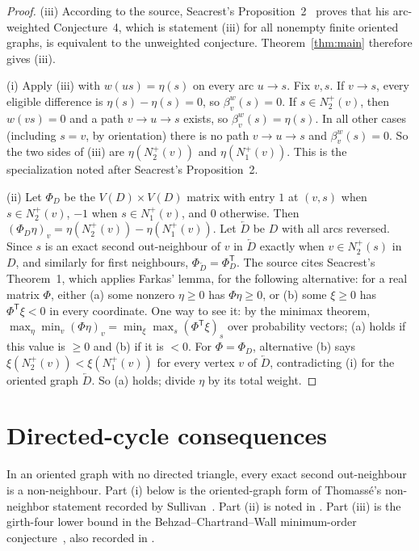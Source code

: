 \documentclass[11pt]{article}
\theoremstyle{remark}
\begin{document}
\begin{proof}
\textup{(iii)} According to the source, Seacrest's
Proposition~2~\cite{Seacrest2015} proves that his arc-weighted Conjecture~4,
which is statement \textup{(iii)} for all nonempty finite oriented graphs,
is equivalent to the unweighted conjecture.  Theorem~\ref{thm:main}
therefore gives \textup{(iii)}.

\textup{(i)} Apply \textup{(iii)} with $w(us)=\eta(s)$ on every arc
$u\to s$.  Fix $v,s$.  If $v\to s$, every eligible difference is
$\eta(s)-\eta(s)=0$, so $\beta_v^w(s)=0$.  If $s\in N_2^+(v)$, then
$w(vs)=0$ and a path $v\to u\to s$ exists, so $\beta_v^w(s)=\eta(s)$.  In
all other cases (including $s=v$, by orientation) there is no path
$v\to u\to s$ and $\beta_v^w(s)=0$.  So the two sides of \textup{(iii)} are
$\eta(N_2^+(v))$ and $\eta(N_1^+(v))$.  This is the specialization noted
after Seacrest's Proposition~2.

\textup{(ii)} Let $\Phi_D$ be the $V(D)\times V(D)$ matrix with entry $1$ at
$(v,s)$ when $s\in N_2^+(v)$, $-1$ when $s\in N_1^+(v)$, and $0$ otherwise.
Then $(\Phi_D\eta)_v=\eta(N_2^+(v))-\eta(N_1^+(v))$.  Let $\overleftarrow D$
be $D$ with all arcs reversed.  Since $s$ is an exact second out-neighbour
of $v$ in $\overleftarrow D$ exactly when $v\in N_2^+(s)$ in $D$, and
similarly for first neighbours,
$\Phi_{\overleftarrow D}=\Phi_D^{\mathsf T}$.  The source cites Seacrest's
Theorem~1, which applies Farkas' lemma, for the following alternative: for a
real matrix $\Phi$, either (a) some nonzero $\eta\ge0$ has $\Phi\eta\ge0$,
or (b) some $\xi\ge0$ has $\Phi^{\mathsf T}\xi<0$ in every coordinate.  One
way to see it: by the minimax theorem,
$\max_\eta\min_v(\Phi\eta)_v=\min_\xi\max_s(\Phi^{\mathsf T}\xi)_s$ over
probability vectors; (a) holds if this value is $\ge0$ and (b) if it is
$<0$.  For $\Phi=\Phi_D$, alternative (b) says
$\xi(N_2^+(v))<\xi(N_1^+(v))$ for every vertex $v$ of $\overleftarrow D$,
contradicting \textup{(i)} for the oriented graph $\overleftarrow D$.  So
(a) holds; divide $\eta$ by its total weight.
\end{proof}

\section{Directed-cycle consequences}\label{sec:directed-cycle-consequences}

In an oriented graph with no directed triangle, every exact second
out-neighbour is a non-neighbour.  Part (i) below is the oriented-graph form
of Thomass\'e's non-neighbor statement recorded by
Sullivan~\cite[Conjecture~6.12]{Sullivan2006}.  Part (ii) is noted in
\cite[Section~3]{Sullivan2006}.  Part (iii) is the girth-four lower bound in
the Behzad--Chartrand--Wall minimum-order
conjecture~\cite{BehzadChartrandWall1970}, also recorded in
\cite[Section~4]{Sullivan2006}.
\end{document}
